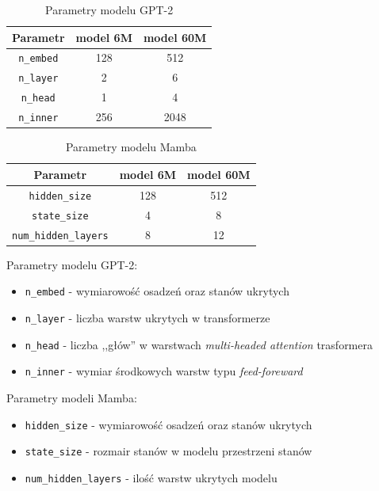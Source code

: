 \documentclass[data-science]{agh-wi} %
\begin{document}
\begin{table}[!htb]
    \caption{Parametry modelu GPT-2}
    \centering
    \begin{tabular}{||c c c||}
        \hline
        Parametr          & model 6M & model 60M \\ [0.5ex]
        \hline\hline
        \texttt{n\_embed} & 128      & 512       \\
        \hline
        \texttt{n\_layer} & 2        & 6         \\
        \hline
        \texttt{n\_head}  & 1        & 4         \\
        \hline
        \texttt{n\_inner} & 256      & 2048      \\
        \hline
    \end{tabular}
\end{table}

\begin{table}[!htb]
    \caption{Parametry modelu Mamba}
    \centering
    \begin{tabular}{||c c c||}
        \hline
        Parametr                     & model 6M & model 60M \\ [0.5ex]
        \hline\hline
        \texttt{hidden\_size}        & 128      & 512       \\
        \hline
        \texttt{state\_size}         & 4        & 8         \\
        \hline
        \texttt{num\_hidden\_layers} & 8        & 12        \\
        \hline
    \end{tabular}
\end{table}

Parametry modelu GPT-2:
\begin{itemize}
    \item \texttt{n\_embed} - wymiarowość osadzeń oraz stanów ukrytych
    \item \texttt{n\_layer} - liczba warstw ukrytych w transformerze
    \item \texttt{n\_head} - liczba ,,głów'' w warstwach \textit{multi-headed attention} trasformera
    \item \texttt{n\_inner} - wymiar środkowych warstw typu \textit{feed-foreward}
\end{itemize}

Parametry modeli Mamba:
\begin{itemize}
    \item \texttt{hidden\_size} - wymiarowość osadzeń oraz stanów ukrytych
    \item \texttt{state\_size} -  rozmair stanów w modelu przestrzeni stanów
    \item \texttt{num\_hidden\_layers} - ilość warstw ukrytych modelu
\end{itemize}
\end{document}
